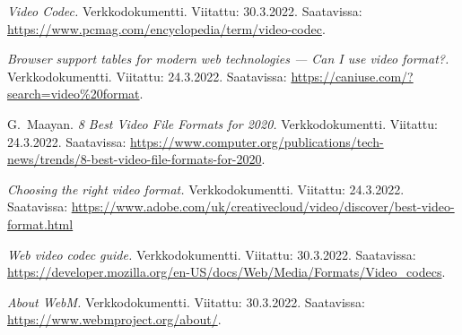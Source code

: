 \documentclass[finnish, 12pt, a4paper, elec, utf8, a-1b, online]{aaltothesis}
\begin{document}
\begin{thebibliography}{99}
    \textit{Video Codec.}
    Verkkodokumentti.
    Viitattu: 30.3.2022.
    Saatavissa: \url{https://www.pcmag.com/encyclopedia/term/video-codec}.

    \textit{Browser support tables for modern web technologies — Can I use video format?.}
    Verkkodokumentti.
    Viitattu: 24.3.2022.
    Saatavissa: \url{https://caniuse.com/?search=video%20format}.

    G.\ Maayan.
    \textit{8 Best Video File Formats for 2020.}
    Verkkodokumentti.
    Viitattu: 24.3.2022.
    Saatavissa: \url{https://www.computer.org/publications/tech-news/trends/8-best-video-file-formats-for-2020}.

    \textit{Choosing the right video format.}
    Verkkodokumentti.
    Viitattu: 24.3.2022.
    Saatavissa: \url{https://www.adobe.com/uk/creativecloud/video/discover/best-video-format.html}

    \textit{Web video codec guide.}
    Verkkodokumentti.
    Viitattu: 30.3.2022.
    Saatavissa: \url{https://developer.mozilla.org/en-US/docs/Web/Media/Formats/Video_codecs}.

    \textit{About WebM.}
    Verkkodokumentti.
    Viitattu: 30.3.2022.
    Saatavissa: \url{https://www.webmproject.org/about/}.



\end{thebibliography}
\end{document}
